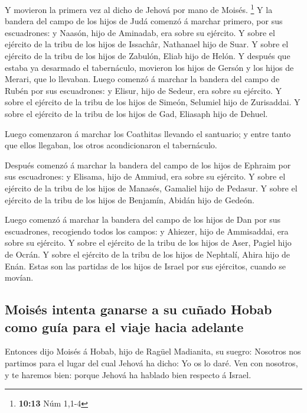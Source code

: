  Y movieron la primera vez al dicho de Jehová por mano de
Moisés. \footnote{\textbf{10:13} Núm 1,1-4}  Y la bandera
del campo de los hijos de Judá comenzó á marchar primero, por sus
escuadrones: y Naasón, hijo de Aminadab, era sobre su ejército.
 Y sobre el ejército de la tribu de los hijos de Issachâr,
Nathanael hijo de Suar.  Y sobre el ejército de la tribu de
los hijos de Zabulón, Eliab hijo de Helón.  Y después que
estaba ya desarmado el tabernáculo, movieron los hijos de Gersón y los
hijos de Merari, que lo llevaban.  Luego comenzó á marchar
la bandera del campo de Rubén por sus escuadrones: y Elisur, hijo de
Sedeur, era sobre su ejército.  Y sobre el ejército de la
tribu de los hijos de Simeón, Selumiel hijo de Zurisaddai. 
Y sobre el ejército de la tribu de los hijos de Gad, Eliasaph hijo de
Dehuel.

 Luego comenzaron á marchar los Coathitas llevando el
santuario; y entre tanto que ellos llegaban, los otros acondicionaron el
tabernáculo.

 Después comenzó á marchar la bandera del campo de los
hijos de Ephraim por sus escuadrones: y Elisama, hijo de Ammiud, era
sobre su ejército.  Y sobre el ejército de la tribu de los
hijos de Manasés, Gamaliel hijo de Pedasur.  Y sobre el
ejército de la tribu de los hijos de Benjamín, Abidán hijo de Gedeón.

 Luego comenzó á marchar la bandera del campo de los hijos
de Dan por sus escuadrones, recogiendo todos los campos: y Ahiezer, hijo
de Ammisaddai, era sobre su ejército.  Y sobre el ejército
de la tribu de los hijos de Aser, Pagiel hijo de Ocrán.  Y
sobre el ejército de la tribu de los hijos de Nephtalí, Ahira hijo de
Enán.  Estas son las partidas de los hijos de Israel por
sus ejércitos, cuando se movían.

\hypertarget{moisuxe9s-intenta-ganarse-a-su-cuuxf1ado-hobab-como-guuxeda-para-el-viaje-hacia-adelante}{%
\subsection{Moisés intenta ganarse a su cuñado Hobab como guía para el
viaje hacia
adelante}\label{moisuxe9s-intenta-ganarse-a-su-cuuxf1ado-hobab-como-guuxeda-para-el-viaje-hacia-adelante}}

 Entonces dijo Moisés á Hobab, hijo de Ragüel Madianita, su
suegro: Nosotros nos partimos para el lugar del cual Jehová ha dicho: Yo
os lo daré. Ven con nosotros, y te haremos bien: porque Jehová ha
hablado bien respecto á Israel.

